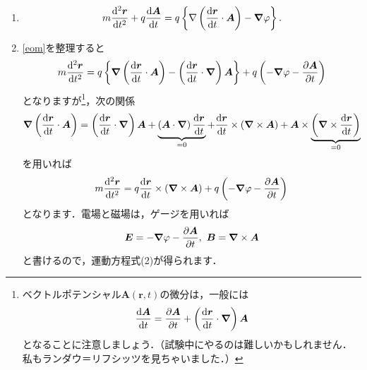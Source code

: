 \documentclass[a4paper,pdflatex,ja=standard]{bxjsarticle}
\begin{document}
\begin{enumerate}

  \item 

  \begin{equation}
    m\dv[2]{\bm{r}}{t}
    +
    q\dv{\bm{A}}{t}
    =
    q
    \left\{  
      \nabla
      \left(  
        \dv{\bm{r}}{t}
        \cdot
        \bm{A}
      \right)
      -
      \bm{\nabla}\varphi
    \right\}
    .
    \label{eom}
  \end{equation}


  \item 

  \eqref{eom}を整理すると
  \begin{equation}
    m\dv[2]{\bm{r}}{t}
    =
    q
    \left\{  
      \bm{\nabla}
      \left(  
        \dv{\bm{r}}{t}
        \cdot
        \bm{A}
      \right)
      -
      \left( \dv{\bm{r}}{t}\cdot\bm{\nabla} \right)
      \bm{A}      
    \right\}
    +
    q
    \left(  
      -
      \bm{\nabla}\varphi
      -
      \pdv{\bm{A}}{t}
    \right)
  \end{equation}
  となりますが\footnote{
    ベクトルポテンシャル$\bm{A}(\bm{r},t)$の微分は，一般には
    $$
      \dv{\bm{A}}{t}
      =
      \pdv{\bm{A}}{t}
      +
      \left( \dv{\bm{r}}{t}\cdot\bm{\nabla} \right)
      \bm{A}
    $$
    となることに注意しましょう．（試験中にやるのは難しいかもしれません．私もランダウ＝リフシッツを見ちゃいました．）
  }，次の関係
  \begin{equation}
    \bm{\nabla}
    \left(  
      \dv{\bm{r}}{t}
      \cdot
      \bm{A}
    \right)    
    =
    \left( \dv{\bm{r}}{t}\cdot\bm{\nabla} \right)
    \bm{A}
    +
    \underbrace{
      \left( \bm{A}\cdot\bm{\nabla} \right)
      \dv{\bm{r}}{t}
    }_{=0}
    +
    \dv{\bm{r}}{t}
    \times
    (\bm{\nabla}\times\bm{A})
    +
    \bm{A}
    \times
    \underbrace{
      \left(\bm{\nabla}\times\dv{\bm{r}}{t}\right)
    }_{=0}
  \end{equation}
  を用いれば
  \begin{equation}
    m\dv[2]{\bm{r}}{t}
    =
    q
    \dv{\bm{r}}{t}
    \times
    (\bm{\nabla}\times\bm{A})
    +
    q
    \left(  
      -
      \bm{\nabla}\varphi
      -
      \pdv{\bm{A}}{t}
    \right)
  \end{equation}
  となります．電場と磁場は，ゲージを用いれば
  \begin{equation}
    \bm{E}
    =
    -
    \bm{\nabla}\varphi
    -
    \pdv{\bm{A}}{t}
    ,\ 
    \bm{B}
    =
    \bm{\nabla}\times\bm{A}
  \end{equation}
  と書けるので，運動方程式(2)が得られます．



\end{enumerate}
\end{document}
